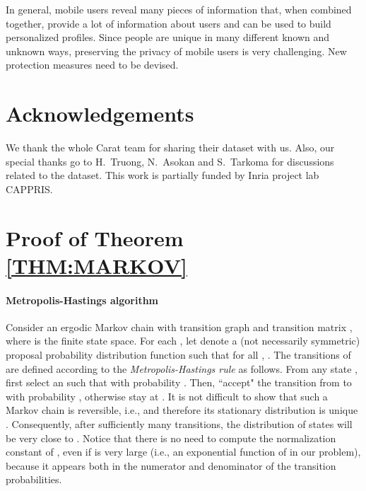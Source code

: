 \documentclass{acm_proc_article-sp}
\theoremstyle{plain}
\theoremstyle{plain}
\theoremstyle{plain}
\theoremstyle{plain}
\theoremstyle{plain}
\theoremstyle{plain}
\begin{document}
In general, mobile users reveal many pieces of information that, when combined together, provide a lot of information about users and can be used to build personalized profiles. 
Since people are unique in many different known and unknown ways, preserving the privacy of mobile users is very challenging. New protection measures need to be devised.












\section*{Acknowledgements}
We thank the whole Carat team for sharing their dataset with us. 
Also, our special thanks go to H.~Truong, N.~Asokan and S.~Tarkoma for discussions related to the dataset. 
This work is partially funded by Inria project lab CAPPRIS.






  

























\appendix

\section{Proof of Theorem \ref{THM:MARKOV}}
\label{sec:app}

\paragraph{Metropolis-Hastings algorithm} Consider an ergodic  Markov  chain  with transition graph  and transition matrix , where  is the finite state space.
 For each , 
let  denote a (not necessarily symmetric) proposal probability distribution function such that for all , .
The transitions of  are defined according to the \emph{Metropolis-Hastings rule} as follows. From any state , first select an  such that  with probability . Then,
``accept" the transition from  to  with probability , otherwise stay at . 
It is not difficult to show \cite{LevinPW09mixing} that such a Markov chain  is reversible, i.e.,  and therefore its stationary distribution  is unique \cite{LevinPW09mixing}. Consequently,  after sufficiently many transitions, the distribution of states will be very close to . Notice that there is no need to compute the normalization constant of ,  even if  is very large (i.e., an exponential function of  in our problem), because it appears both in the numerator and denominator of the transition probabilities. 
\end{document}
